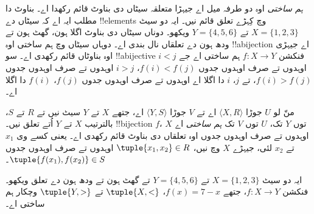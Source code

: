 \documentclass[../../../include/open-logic-section]{subfiles}
\begin{document}

\begin{explain}
\emph{ہم ساختی} اوہ دو طرفہ میل اے جیہڑا متعلقہ سیٹاں دی بناوٹ قائم رکھدا اے۔ بناوٹ دا مطلب ایہ اے کہ سیٹاں دے !!{element}s وچ کِہڑے تعلق قائم نیں۔ ایہ دو سیٹ $X=\{1,2,3\}$ تے $Y=\{4,5,6\}$ ویکھو۔ دوناں سیٹاں دی بناوٹ اگلا ہون، گھٹ ہون تے ودھ ہون دے تعلقاں نال بندی اے۔ دوہاں سیٹاں وچ ہم ساختی اوہ !!a{bijection} اے جیہڑی اوہ بناوٹاں قائم رکھدی اے۔ سو !!a{bijective} فنکشن $f \colon X
\to Y$ ہم ساختی اے جے $i<j$ اوہدوں تے صرف اوہدوں جدوں $f(i)<f(j)$، $i>j$ اوہدوں تے صرف اوہدوں جدوں $f(i)>f(j)$، تے $j$، $i$ دا اگلا اے اوہدوں تے صرف اوہدوں جدوں $f(j)$، $f(i)$ دا اگلا اے۔
\end{explain}

\begin{defn}[ہم ساختی]
منّ لو $U$ جوڑا $\langle X, R\rangle$ اے تے $V$ جوڑا $\langle
Y, S\rangle$ اے، جتھے $X$ تے $Y$ سیٹ نیں تے $R$ تے $S$، بالترتیب $X$ تے $Y$ اُتے تعلق نیں۔ !!{bijection} $f$، $X$ توں $Y$ تک، $U$ توں $V$ تک \emph{ہم ساختی} اے اوہدوں تے صرف اوہدوں جدوں اوہ تعلقاں دی بناوٹ قائم رکھدی اے۔ یعنی کسے وی $x_{1}$ تے $x_{2}$ لئی، جیہڑے $X$ وچ نیں، $\tuple{x_1,x_2} \in R$ اوہدوں تے صرف اوہدوں جدوں $\tuple{f(x_1),f(x_2)} \in S$۔
\end{defn}

\begin{ex}
ایہ دو سیٹ $X=\{1,2,3\}$ تے $Y=\{4,5,6\}$ تے گھٹ ہون تے ودھ ہون دے تعلق ویکھو۔ فنکشن $f\colon X \to
Y$، جتھے $f(x) = 7-x$، $\tuple{X,<}$ تے $\tuple{Y,>}$ وچکار ہم ساختی اے۔
\end{ex}
\end{document}

